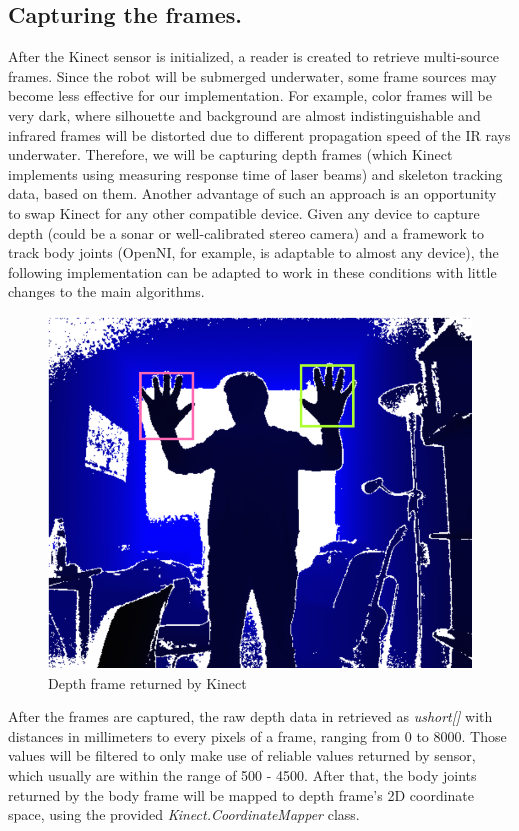 \documentclass[a4paper,11pt,oneside]{article}
\begin{document}
\subsection{Capturing the frames.}

After the Kinect sensor is initialized, a reader is created to retrieve multi-source frames.  Since the robot will be submerged underwater, some frame sources may become less effective for our implementation. For example, color frames will be very dark, where silhouette and background are almost indistinguishable and infrared frames will be distorted due to different propagation speed of the IR rays underwater. Therefore, we will be capturing depth frames (which Kinect implements using measuring response time of laser beams) and skeleton tracking data, based on them. Another advantage of such an approach is an opportunity to swap Kinect for any other compatible device. Given any device to capture depth (could be a sonar or well-calibrated stereo camera) and a framework to track body joints (OpenNI, for example, is adaptable to almost any device), the following implementation can be adapted to work in these conditions with little changes to the main algorithms.

\begin{figure}[H]
\centering
\includegraphics[scale=0.70]{depth-frame.png}
\caption{Depth frame returned by Kinect}
\end{figure}

After the frames are captured, the raw depth data in retrieved as \textit{ushort[]} with distances in millimeters to every pixels of a frame, ranging from 0 to 8000. Those values will be filtered to only make use of reliable values returned by sensor, which usually are within the range of 500 - 4500. After that, the body joints returned by the body frame will be mapped to depth frame's 2D coordinate space, using the provided \textit{Kinect.CoordinateMapper} class.
\end{document}
